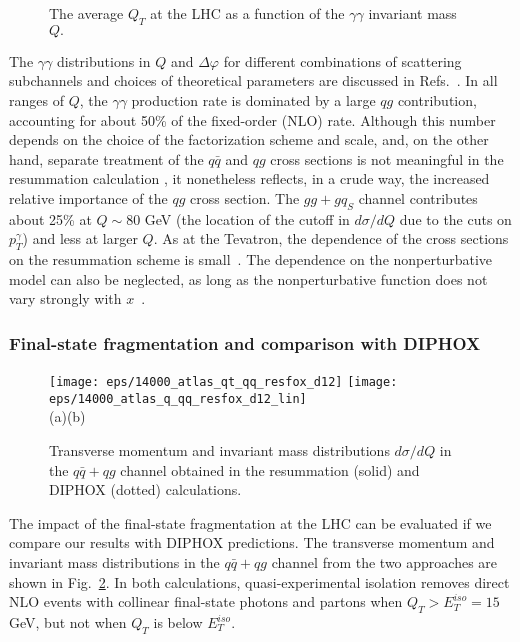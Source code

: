 \documentclass[12pt,english,aps,preprint,prd,letterpaper,fleqn,nofootinbib,showpacs,showkeys,tightenlines,floatfix]{revtex4}
\begin{document}
{\begin{figure}
\caption{The average $Q_{T}$ at the LHC as a function of the $\gamma\gamma$
invariant mass $Q.$ \label{Fig:QTaveLHC}}
\end{figure}

The $\gamma\gamma$ distributions in $Q$ and $\Delta\varphi$ for
different combinations of scattering subchannels and choices of theoretical
parameters are discussed in Refs.~\cite{Balazs:2006cc,Nadolsky:2007ba}.
In all ranges of $Q$, the $\gamma\gamma$ production rate is dominated
by a large $qg$ contribution, accounting for about 50\% of the
fixed-order (NLO)
rate. Although this number depends on the choice 
of the factorization scheme and scale, and, on the other hand, separate
treatment of  the $q\bar q$ and $qg$ cross sections is not meaningful 
in the resummation calculation
\cite{Nadolsky:2007ba}, it nonetheless reflects, in a crude way,
the increased relative importance of the $qg$ cross section. 
The $gg+gq_{S}$ channel contributes about 25\% at $Q\sim80$
GeV (the location of the cutoff in $d\sigma/dQ$ due to the cuts on 
$p_{T}^{\gamma}$) and less at larger $Q.$ As at the Tevatron, the dependence
of the cross sections on the resummation scheme is small~\cite{Nadolsky:2007ba}.
The dependence on the nonperturbative model can also be neglected,
as long as the nonperturbative function does not vary strongly with
$x$~\cite{Nadolsky:2007ba}.

\subsubsection{Final-state fragmentation and comparison with DIPHOX}

\begin{figure}
\texttt{[image: eps/14000\_atlas\_qt\_qq\_resfox\_d12]}
\texttt{[image: eps/14000\_atlas\_q\_qq\_resfox\_d12\_lin]}\\
 (a)\hspace{3in}(b)


\caption{Transverse momentum and invariant mass distributions $d\sigma/dQ$
in the $q\bar{q}+qg$ channel obtained in the resummation (solid)
and DIPHOX (dotted) calculations.}

\label{Fig:ResFoxQQLHC} 
\end{figure}


The impact of the final-state fragmentation at the LHC can be evaluated
if we compare our results with DIPHOX predictions. The transverse
momentum and invariant mass distributions in the $q\bar{q}+qg$ channel
from the two approaches are shown in Fig.~\ref{Fig:ResFoxQQLHC}.
In both calculations, quasi-experimental isolation removes direct
NLO events with collinear final-state photons and partons when $Q_{T}>E_{T}^{iso}=15$
GeV, but not when $Q_{T}$ is below $E_{T}^{iso}$.

}
\end{document}
